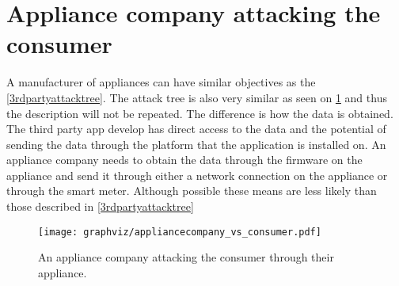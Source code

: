 
\section{Appliance company attacking the consumer}
A manufacturer of appliances can have similar objectives as the \cref{3rdpartyattacktree}.
The attack tree is also very similar as seen on \cref{applianceCompanyTree} and thus the description will not be repeated.
The difference is how the data is obtained.
The third party app develop has direct access to the data and the potential of sending the data through the platform that the application is installed on.
An appliance company needs to obtain the data through the firmware on the appliance and send it through either a network connection on the appliance or through the smart meter.
Although possible these means are less likely than those described in \cref{3rdpartyattacktree}

\begin{figure}
  \begin{center}
    \texttt{[image: graphviz/appliancecompany\_vs\_consumer.pdf]}
  \end{center}
  \caption{An appliance company attacking the consumer through their appliance.}
  \label{applianceCompanyTree}
\end{figure}
